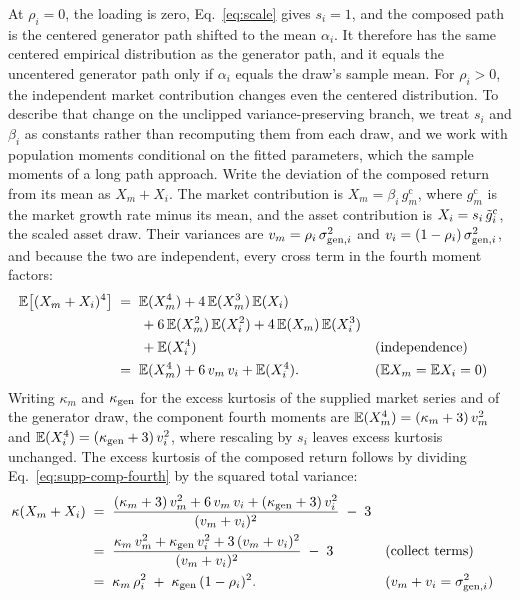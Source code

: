 At $\rho_i = 0$, the loading is zero, Eq.~\eqref{eq:scale} gives
$s_i = 1$, and the composed path is the centered generator path
shifted to the mean $\alpha_i$. It therefore has the same centered
empirical distribution as the generator path, and it equals the
uncentered generator path only if $\alpha_i$ equals the draw's sample
mean. For $\rho_i > 0$, the independent market contribution changes
even the centered distribution. To describe that change on the
unclipped variance-preserving branch, we treat $s_i$ and $\beta_i$ as
constants rather than recomputing them from each draw, and we work
with population moments conditional on the fitted parameters, which
the sample moments of a long path approach. Write the deviation of the
composed return from its mean as $X_m + X_i$. The market contribution
is $X_m = \beta_i\, g_m^{\mathrm c}$, where $g_m^{\mathrm c}$ is the
market growth rate minus its mean, and the asset contribution is
$X_i = s_i\, \tilde{g}_i^{\mathrm c}$, the scaled asset draw. Their variances
are $v_m = \rho_i\, \sigma_{\mathrm{gen},i}^2$ and
$v_i = (1 - \rho_i)\, \sigma_{\mathrm{gen},i}^2$, and because the two are
independent, every cross term in the fourth moment factors:
\begin{align}
  \mathbb{E}\big[(X_m + X_i)^4\big]
   &\;=\; \mathbb{E}(X_m^4) + 4\,\mathbb{E}(X_m^3)\,\mathbb{E}(X_i)
     \notag \\
   &\qquad + 6\,\mathbb{E}(X_m^2)\,\mathbb{E}(X_i^2)
     + 4\,\mathbb{E}(X_m)\,\mathbb{E}(X_i^3)
     \notag \\
   &\qquad + \mathbb{E}(X_i^4)
     && \text{(independence)} \notag \\
   &\;=\; \mathbb{E}(X_m^4) + 6\, v_m\, v_i + \mathbb{E}(X_i^4).
     && \text{($\mathbb{E} X_m = \mathbb{E} X_i = 0$)}
  \label{eq:supp-comp-fourth}
\end{align}
Writing $\kappa_m$ and $\kappa_{\mathrm{gen}}$ for the excess kurtosis of the
supplied market series and of the generator draw, the component
fourth moments are $\mathbb{E}(X_m^4) = (\kappa_m + 3)\, v_m^2$ and
$\mathbb{E}(X_i^4) = (\kappa_{\mathrm{gen}} + 3)\, v_i^2$, where rescaling by $s_i$
leaves excess kurtosis unchanged. The excess kurtosis of the composed
return follows by dividing Eq.~\eqref{eq:supp-comp-fourth} by the
squared total variance:
\begin{align}
  \kappa(X_m + X_i)
   &\;=\; \frac{(\kappa_m + 3)\, v_m^2 + 6\, v_m\, v_i
     + (\kappa_{\mathrm{gen}} + 3)\, v_i^2}{(v_m + v_i)^2} \;-\; 3
     \notag \\
   &\;=\; \frac{\kappa_m\, v_m^2 + \kappa_{\mathrm{gen}}\, v_i^2
     + 3\, (v_m + v_i)^2}{(v_m + v_i)^2} \;-\; 3
     && \text{(collect terms)} \notag \\
   &\;=\; \kappa_m\, \rho_i^2 \;+\; \kappa_{\mathrm{gen}}\, (1 - \rho_i)^2.
     && \text{($v_m + v_i = \sigma_{\mathrm{gen},i}^2$)}
  \label{eq:supp-kurt-comp}
\end{align}
